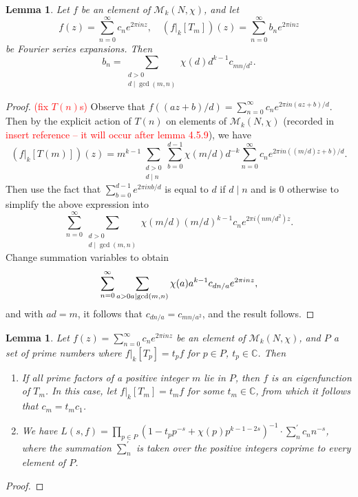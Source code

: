 \documentclass[10pt,leqno,twoside]{article}
\theoremstyle{plain}
\newtheorem{lemma}[lem]{Lemma}
\theoremstyle{definition}
\numberwithin{equation}{section}
\numberwithin{lem}{section}
\newcommand{\textib}[1]{\textbf{\textit{#1\index{#1}}}} %
\newcommand{\tbd}{{\Huge\color{red}{\textib{TO DO}}}}
\newcommand{\sai}[1]{\textcolor{red}{#1}}
\begin{document}
\begin{lemma}\label{lem: miyake lem 4.5.14}
    Let $f$ be an element of $\mathcal M_k(N,\chi)$, and let \[
        f(z) = \sum_{n=0}^\infty c_ne^{2\pi i n z},\quad
        (f|_k[T_m])(z) = \sum_{n=0}^\infty b_ne^{2\pi i nz}\] be Fourier series expansions. Then \[b_n = \sum_{\substack{d>0 \\ d\mid \gcd(m,n)}}\chi(d)d^{k-1}c_{mn/d^2}.\]
\end{lemma}
\begin{proof} \tbd \sai{(fix $T(n)$s)}
    Observe that $f((az+b)/d) = \sum_{n=0}^\infty c_ne^{2\pi in(az+b)/d}$. Then by the explicit action of $T(n)$ on elements of $\mathcal M_k(N,\chi)$ (recorded in \sai{insert reference -- it will occur after lemma 4.5.9}), we have
    \[(f|_k[T(m)])(z) = m^{k-1}\sum_{\substack{d>0\\d\mid n}}\sum_{b=0}^{d-1}\chi(m/d)d^{-k}\sum_{n=0}^\infty c_ne^{2\pi in((m/d)z+b)/d}.\] Then use the fact that $\sum_{b=0}^{d-1}e^{2\pi i n b/d}$ is equal to $d$ if $d\mid n$ and is $0$ otherwise to simplify the above expression into 
    \[\sum_{n=0}^\infty \sum_{\substack{d>0\\d\mid \gcd(m,n)}}\chi(m/d)(m/d)^{k-1}c_ne^{2\pi i(nm/d^2)z}.\] Change summation variables to obtain 
    \[\sum_{n=0}^\infty \sum_{a>0\\ a\mid \gcd(m,n)}\chi(a)a^{k-1}c_{dn/a}e^{2\pi inz},\] and with $ad = m$, it follows that $c_{dn/a} = c_{mn/a^2}$, and the result follows.
\end{proof}
\begin{lemma}\label{lem: miyake lem 4.5.15}
    Let $f(z) = \sum_{n=0}^\infty c_ne^{2\pi i n z}$ be an element of $\mathcal M_k(N,\chi)$, and $P$ a set of prime numbers where $f|_k[T_p] = t_pf$ for $p\in P$, $t_p\in\mathbb C$. Then 
    \begin{enumerate}[label=\textup{(\arabic*)}]
        \item If all prime factors of a positive integer $m$ lie in $P$, then $f$ is an eigenfunction of $T_m$. In this case, let $f|_k[T_m] = t_mf$ for some $t_m\in\mathbb C$, from which it follows that $c_m = t_mc_1$.
        \item We have $L(s,f) = \prod_{p\in P}(1-t_pp^{-s} + \chi(p)p^{k-1-2s})^{-1}\cdot \sum_n^\prime c_nn^{-s}$, where the summation $\sum_n^\prime$ is taken over the positive integers coprime to every element of $P$.
    \end{enumerate}
\end{lemma}
\begin{proof}
    \tbd
\end{proof}
\end{document}
